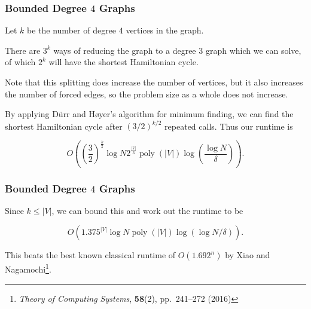 \documentclass[]{beamer}
\DeclareMathOperator{\poly}{poly}
\begin{document}
\begin{frame}
\frametitle{Bounded Degree $4$ Graphs}
Let $k$ be the number of degree $4$ vertices in the graph.

There are $3^k$ ways of reducing the graph to a degree $3$ graph which we can solve, of which $2^k$ will have the shortest Hamiltonian cycle.

Note that this splitting does increase the number of vertices, but it also increases the number of forced edges, so the problem size as a whole does not increase.

By applying D\"urr and H\o yer's algorithm for minimum finding, we can find the shortest Hamiltonian cycle after $(3/2)^{k/2}$ repeated calls. Thus our runtime is

$$O\left(\left(\frac{3}{2}\right)^{\frac{k}{2}}\log N2^{\frac{|V|}{3}}\poly(|V|)\log\left(\frac{\log N}{\delta}\right)\right).$$
\end{frame}

\begin{frame}
\frametitle{Bounded Degree $4$ Graphs}

Since $k \leq |V|$, we can bound this and work out the runtime to be

$$O(1.375^{|V|}\log N\poly(|V|)\log(\log N/\delta)).$$

This beats the best known classical runtime of $O(1.692^n)$ by Xiao and Nagamochi\footnote{{\em Theory of Computing Systems}, {\bf 58}(2), pp.\ 241--272 (2016)}.
\end{frame}
\end{document}
